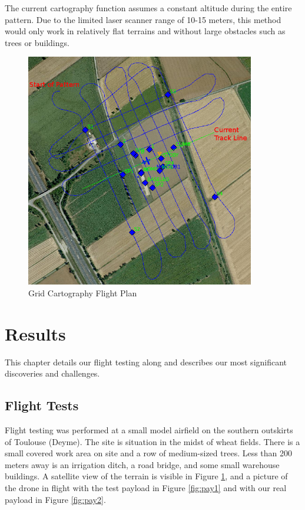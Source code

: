 \documentclass[a4paper,11pt]{report}
\begin{document}
The current cartography function assumes a constant altitude during the entire pattern. Due to the limited laser scanner range of 10-15 meters, this method would only work in relatively flat terrains and without large obstacles such as trees or buildings.

\begin{figure}[ht]
 \centering
 \includegraphics[width=10cm]{pprz_cartography.png}
 \caption{Grid Cartography Flight Plan}
 \label{fig:gridcarto}
\end{figure}

\chapter{Results}

This chapter details our flight testing along and describes our most significant discoveries and challenges.

\section{Flight Tests}
\label{flight_tests}

Flight testing was performed at a small model airfield on the southern outskirts of Toulouse (Deyme). The site is situation in the midst of wheat fields. There is a small covered work area on site and a row of medium-sized trees. Less than 200 meters away is an irrigation ditch, a road bridge, and some small warehouse buildings. A satellite view of the terrain is visible in Figure \ref{fig:gridcarto}, and a picture of the drone in flight with the test payload in Figure \ref{fig:pay1} and with our real payload in Figure \ref{fig:pay2}.
\end{document}

